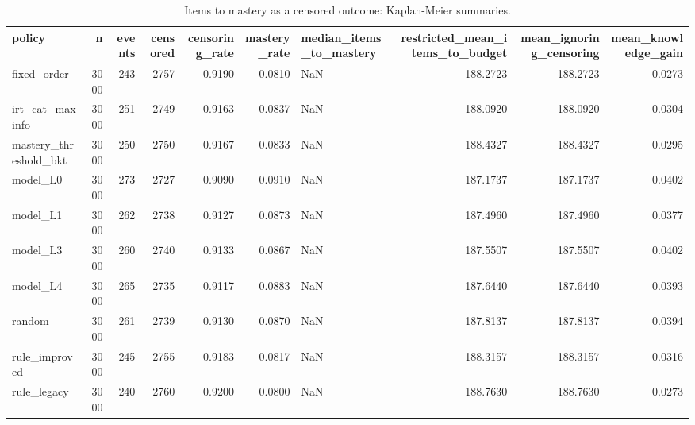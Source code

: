 \begin{table}
\caption{Items to mastery as a censored outcome: Kaplan-Meier summaries.}
\label{tab:censoring}
\begin{tabular}{lrrrrrlrrr}
\toprule
policy & n & events & censored & censoring\_rate & mastery\_rate & median\_items\_to\_mastery & restricted\_mean\_items\_to\_budget & mean\_ignoring\_censoring & mean\_knowledge\_gain \\
\midrule
fixed\_order & 3000 & 243 & 2757 & 0.9190 & 0.0810 & NaN & 188.2723 & 188.2723 & 0.0273 \\
irt\_cat\_maxinfo & 3000 & 251 & 2749 & 0.9163 & 0.0837 & NaN & 188.0920 & 188.0920 & 0.0304 \\
mastery\_threshold\_bkt & 3000 & 250 & 2750 & 0.9167 & 0.0833 & NaN & 188.4327 & 188.4327 & 0.0295 \\
model\_L0 & 3000 & 273 & 2727 & 0.9090 & 0.0910 & NaN & 187.1737 & 187.1737 & 0.0402 \\
model\_L1 & 3000 & 262 & 2738 & 0.9127 & 0.0873 & NaN & 187.4960 & 187.4960 & 0.0377 \\
model\_L3 & 3000 & 260 & 2740 & 0.9133 & 0.0867 & NaN & 187.5507 & 187.5507 & 0.0402 \\
model\_L4 & 3000 & 265 & 2735 & 0.9117 & 0.0883 & NaN & 187.6440 & 187.6440 & 0.0393 \\
random & 3000 & 261 & 2739 & 0.9130 & 0.0870 & NaN & 187.8137 & 187.8137 & 0.0394 \\
rule\_improved & 3000 & 245 & 2755 & 0.9183 & 0.0817 & NaN & 188.3157 & 188.3157 & 0.0316 \\
rule\_legacy & 3000 & 240 & 2760 & 0.9200 & 0.0800 & NaN & 188.7630 & 188.7630 & 0.0273 \\
\bottomrule
\end{tabular}
\end{table}
